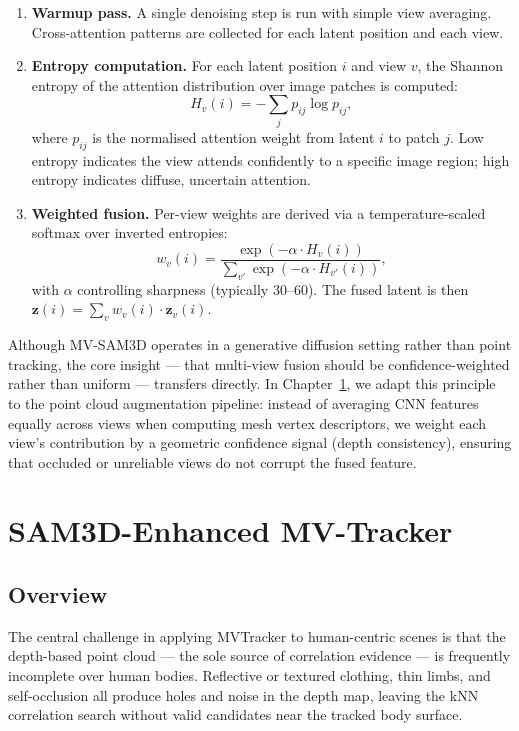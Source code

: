 \documentclass[12pt, a4paper, oneside]{report}
\begin{document}
\begin{enumerate}
    \item \textbf{Warmup pass.} A single denoising step is run with simple view averaging. Cross-attention patterns are collected for each latent position and each view.
    \item \textbf{Entropy computation.} For each latent position $i$ and view $v$, the Shannon entropy of the attention distribution over image patches is computed:
    \begin{equation}
        H_v(i) = -\sum_j p_{ij} \log p_{ij},
    \end{equation}
    where $p_{ij}$ is the normalised attention weight from latent $i$ to patch $j$. Low entropy indicates the view attends confidently to a specific image region; high entropy indicates diffuse, uncertain attention.
    \item \textbf{Weighted fusion.} Per-view weights are derived via a temperature-scaled softmax over inverted entropies:
    \begin{equation}
        w_v(i) = \frac{\exp(-\alpha \cdot H_v(i))}{\sum_{v'} \exp(-\alpha \cdot H_{v'}(i))},
    \end{equation}
    with $\alpha$ controlling sharpness (typically 30--60). The fused latent is then $\mathbf{z}(i) = \sum_v w_v(i) \cdot \mathbf{z}_v(i)$.
\end{enumerate}

Although MV-SAM3D operates in a generative diffusion setting rather than point tracking, the core insight --- that multi-view fusion should be confidence-weighted rather than uniform --- transfers directly. In Chapter~\ref{ch:method}, we adapt this principle to the point cloud augmentation pipeline: instead of averaging CNN features equally across views when computing mesh vertex descriptors, we weight each view's contribution by a geometric confidence signal (depth consistency), ensuring that occluded or unreliable views do not corrupt the fused feature.

\chapter{SAM3D-Enhanced MV-Tracker}
\label{ch:method}
\section{Overview}
The central challenge in applying MVTracker to human-centric scenes is that the depth-based point cloud --- the sole source of correlation evidence --- is frequently incomplete over human bodies. Reflective or textured clothing, thin limbs, and self-occlusion all produce holes and noise in the depth map, leaving the kNN correlation search without valid candidates near the tracked body surface.
\end{document}
